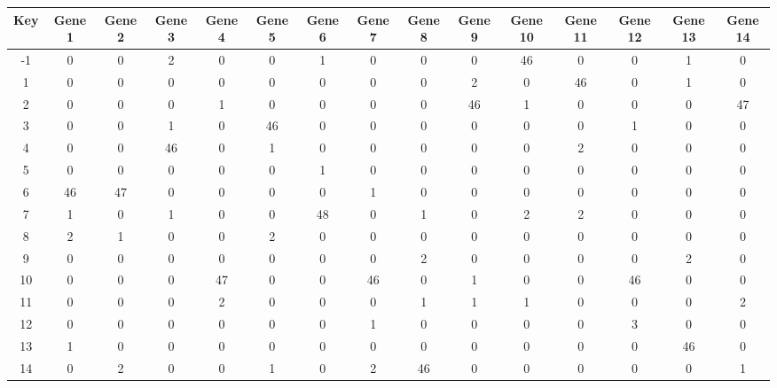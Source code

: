 \begin{tabular}{|c|c|c|c|c|c|c|c|c|c|c|c|c|c|c|}
\hline
Key & Gene 1 & Gene 2 & Gene 3 & Gene 4 & Gene 5 & Gene 6 & Gene 7 & Gene 8 & Gene 9 & Gene 10 & Gene 11 & Gene 12 & Gene 13 & Gene 14 \\
\hline
-1 & 0 & 0 & 2 & 0 & 0 & 1 & 0 & 0 & 0 & 46 & 0 & 0 & 1 & 0 \\
1 & 0 & 0 & 0 & 0 & 0 & 0 & 0 & 0 & 2 & 0 & 46 & 0 & 1 & 0 \\
2 & 0 & 0 & 0 & 1 & 0 & 0 & 0 & 0 & 46 & 1 & 0 & 0 & 0 & 47 \\
3 & 0 & 0 & 1 & 0 & 46 & 0 & 0 & 0 & 0 & 0 & 0 & 1 & 0 & 0 \\
4 & 0 & 0 & 46 & 0 & 1 & 0 & 0 & 0 & 0 & 0 & 2 & 0 & 0 & 0 \\
5 & 0 & 0 & 0 & 0 & 0 & 1 & 0 & 0 & 0 & 0 & 0 & 0 & 0 & 0 \\
6 & 46 & 47 & 0 & 0 & 0 & 0 & 1 & 0 & 0 & 0 & 0 & 0 & 0 & 0 \\
7 & 1 & 0 & 1 & 0 & 0 & 48 & 0 & 1 & 0 & 2 & 2 & 0 & 0 & 0 \\
8 & 2 & 1 & 0 & 0 & 2 & 0 & 0 & 0 & 0 & 0 & 0 & 0 & 0 & 0 \\
9 & 0 & 0 & 0 & 0 & 0 & 0 & 0 & 2 & 0 & 0 & 0 & 0 & 2 & 0 \\
10 & 0 & 0 & 0 & 47 & 0 & 0 & 46 & 0 & 1 & 0 & 0 & 46 & 0 & 0 \\
11 & 0 & 0 & 0 & 2 & 0 & 0 & 0 & 1 & 1 & 1 & 0 & 0 & 0 & 2 \\
12 & 0 & 0 & 0 & 0 & 0 & 0 & 1 & 0 & 0 & 0 & 0 & 3 & 0 & 0 \\
13 & 1 & 0 & 0 & 0 & 0 & 0 & 0 & 0 & 0 & 0 & 0 & 0 & 46 & 0 \\
14 & 0 & 2 & 0 & 0 & 1 & 0 & 2 & 46 & 0 & 0 & 0 & 0 & 0 & 1 \\
\hline
\end{tabular}